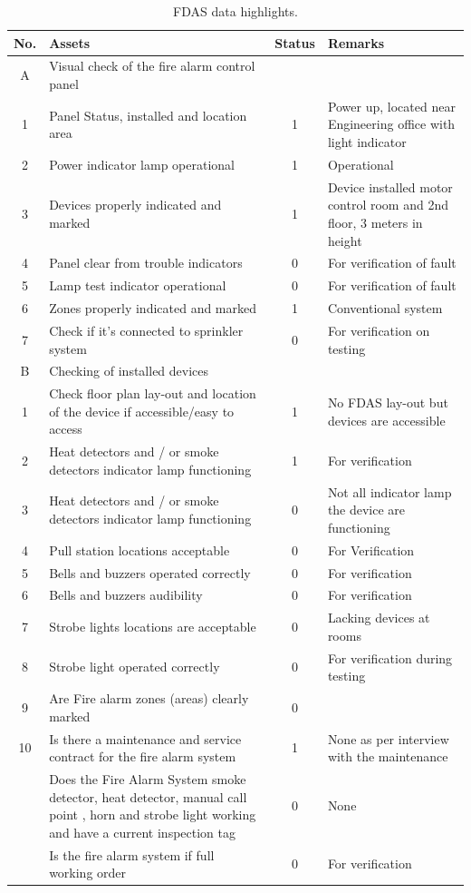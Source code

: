 \begin{table}[!h]
	\caption{FDAS data highlights.}
	\label{ch04_fdas01}
	{\scriptsize
\begin{tabular}{c|p{6.5cm}|c|p{6.5cm}}
	\hline
	No. & Assets & Status & Remarks \\ 
	\hline
	A & Visual check of the fire alarm control panel &  &  \\ 
	1 & Panel Status, installed and location area & 1 & Power up, located near Engineering office with light indicator \\ 
	2 & Power indicator lamp operational & 1 & Operational \\ 
	3 & Devices properly indicated and marked & 1 & Device installed \@ motor control room and 2nd floor, 3 meters in height \\ 
	4 & Panel clear from trouble indicators & 0 & For verification of fault \\ 
	5 & Lamp test indicator operational & 0 & For verification of fault \\ 
	6 & Zones properly indicated and marked & 1 & Conventional system \\ 
	7 & Check if it’s connected to sprinkler system & 0 & For verification on testing \\ 
	\hline
	B & Checking of installed devices &  &  \\ 
	1 & Check floor plan lay-out and location of the device if accessible/easy to access & 1 & No FDAS lay-out but devices are accessible \\ 
	2 & Heat detectors and / or smoke detectors indicator lamp functioning & 1 & For verification \\ 
	3 & Heat detectors and / or smoke detectors indicator lamp functioning & 0 & Not all indicator lamp \@ the device are functioning \\ 
	4 & Pull station locations acceptable & 0 & For Verification \\ 
	5 & Bells and buzzers operated correctly & 0 & For verification \\ 
	6 & Bells and buzzers audibility & 0 & For verification \\ 
	7 & Strobe lights locations are acceptable & 0 & Lacking devices at rooms \\ 
	8 & Strobe light operated correctly & 0 & For verification during testing \\ 
	9 & Are Fire alarm zones (areas) clearly marked & 0 &  \\ 
	10 & Is there a maintenance and service contract for the fire alarm system & 1 & None as per interview with the maintenance \\ 
	& Does the Fire Alarm System smoke detector, heat detector, manual call point , horn and strobe light working and  have a current inspection tag & 0 & None \\ 
	& Is the fire alarm system if full working order & 0 & For verification \\ 
	\hline
\end{tabular}

	}
\end{table}

